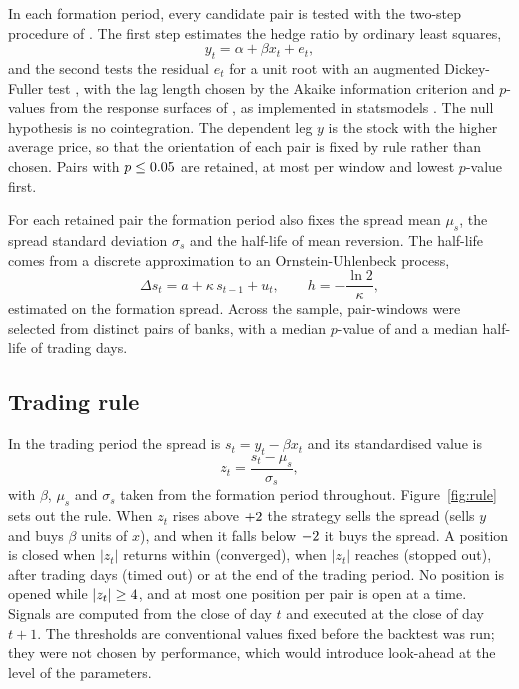 \documentclass[11pt]{article}
\begin{document}
In each formation period, every candidate pair is tested with the two-step
procedure of \citet{engle1987}. The first step estimates the hedge ratio by
ordinary least squares,
\begin{equation}\label{eq:hedge}
  y_t = \alpha + \beta x_t + e_t ,
\end{equation}
and the second tests the residual $e_t$ for a unit root with an augmented
Dickey-Fuller test \citep{dickey1979}, with the lag length chosen by the Akaike
information criterion and $p$-values from the response surfaces of
\citet{mackinnon2010}, as implemented in statsmodels \citep{seabold2010}. The null
hypothesis is no cointegration. The dependent leg $y$ is the stock with the higher
average price, so that the orientation of each pair is fixed by rule rather than
chosen. Pairs with $p \le 0.05$ are retained, at most \MaxPairs{} per window
and lowest $p$-value first.

For each retained pair the formation period also fixes the spread mean $\mu_s$, the
spread standard deviation $\sigma_s$ and the half-life of mean reversion. The
half-life comes from a discrete approximation to an Ornstein-Uhlenbeck process,
\begin{equation}\label{eq:halflife}
  \Delta s_t = a + \kappa\, s_{t-1} + u_t, \qquad h = -\frac{\ln 2}{\kappa},
\end{equation}
estimated on the formation spread. Across the sample, \PairWindows{} pair-windows
were selected from \UniquePairs{} distinct pairs of banks, with a median $p$-value of
\MedianP{} and a median half-life of \MedianHalfLife{} trading days.

\subsection{Trading rule}

In the trading period the spread is $s_t = y_t - \beta x_t$ and its standardised
value is
\begin{equation}\label{eq:z}
  z_t = \frac{s_t - \mu_s}{\sigma_s},
\end{equation}
with $\beta$, $\mu_s$ and $\sigma_s$ taken from the formation period throughout.
Figure~\ref{fig:rule} sets out the rule. When $z_t$ rises above $+2$ the
strategy sells the spread (sells $y$ and buys $\beta$ units of $x$), and when it falls
below $-2$ it buys the spread. A position is closed when $|z_t|$ returns within
\ExitZ{} (converged), when $|z_t|$ reaches \StopZ{} (stopped out), after \MaxHold{}
trading days (timed out) or at the end of the trading period. No position is opened
while $|z_t| \ge 4$, and at most one position per pair is open at a time.
Signals are computed from the close of day $t$ and executed at the close of day
$t+1$. The thresholds are conventional values fixed before the backtest was run;
they were not chosen by performance, which would introduce look-ahead at the level
of the parameters.
\end{document}
